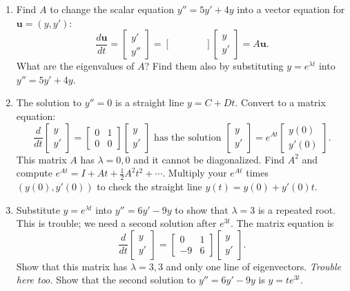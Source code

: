 \documentclass[14pt, a4paper]{article}
\begin{document}
\begin{enumerate}[resume]
    \item Find $A$ to change the scalar equation $y'' = 5y' + 4y$ into a vector equation for $\mathbf{u} = (y, y')$:
          \[
              \frac{d\mathbf{u}}{dt} = \begin{bmatrix} y' \\ y'' \end{bmatrix} = \begin{bmatrix} \quad & \quad \\ \quad & \quad \end{bmatrix} \begin{bmatrix} y \\ y' \end{bmatrix} = A\mathbf{u}.
          \]
          What are the eigenvalues of $A$? Find them also by substituting $y = e^{\lambda t}$ into $y'' = 5y' + 4y$.

    \item The solution to $y'' = 0$ is a straight line $y = C + Dt$. Convert to a matrix equation:
          \[
              \frac{d}{dt} \begin{bmatrix} y \\ y' \end{bmatrix} = \begin{bmatrix} 0 & 1 \\ 0 & 0 \end{bmatrix} \begin{bmatrix} y \\ y' \end{bmatrix} \text{ has the solution } \begin{bmatrix} y \\ y' \end{bmatrix} = e^{At} \begin{bmatrix} y(0) \\ y'(0) \end{bmatrix} .
          \]
          This matrix $A$ has $\lambda = 0, 0$ and it cannot be diagonalized. Find $A^2$ and compute $e^{At} = I + At + \frac{1}{2}A^2t^2 + \cdots$. Multiply your $e^{At}$ times $(y(0), y'(0))$ to check the straight line $y(t) = y(0) + y'(0)t$.

    \item Substitute $y = e^{\lambda t}$ into $y'' = 6y' - 9y$ to show that $\lambda = 3$ is a repeated root. This is trouble; we need a second solution after $e^{3t}$. The matrix equation is
          \[
              \frac{d}{dt} \begin{bmatrix} y \\ y' \end{bmatrix} = \begin{bmatrix} 0 & 1 \\ -9 & 6 \end{bmatrix} \begin{bmatrix} y \\ y' \end{bmatrix} .
          \]
          Show that this matrix has $\lambda = 3, 3$ and only one line of eigenvectors. \textit{Trouble here too.} Show that the second solution to $y'' = 6y' - 9y$ is $y = te^{3t}$.


\end{enumerate}
\end{document}
